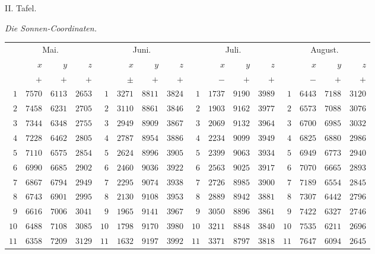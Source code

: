 \begin{center}
II. Tafel.

\medskip\emph{Die Sonnen-Coordinaten.}\medskip

\begingroup\fontsize{9}{10.2}\selectfont\setlength{\tabcolsep}{2pt}
\begin{tabular}{r|r|r|r||r|r|r|r||r|r|r|r||r|r|r|r}
\multicolumn{4}{c||}{Mai.} & \multicolumn{4}{c||}{Juni.} & \multicolumn{4}{c||}{Juli.} & \multicolumn{4}{c}{August.}\\[3pt]
 & $x$ & $y$ & $z$ &  & $x$ & $y$ & $z$ &  & $x$ & $y$ & $z$ &  & $x$ & $y$ & $z$\\
 & $+$ & $+$ & $+$ &  & $\pm$ & $+$ & $+$ &  & $-$ & $+$ & $+$ &  & $-$ & $+$ & $+$\\\hline
$1$ & $7570$ & $6113$ & $2653$ & $1$ & $3271$ & $8811$ & $3824$ & $1$ & $1737$ & $9190$ & $3989$ & $1$ & $6443$ & $7188$ & $3120$\\
$2$ & $7458$ & $6231$ & $2705$ & $2$ & $3110$ & $8861$ & $3846$ & $2$ & $1903$ & $9162$ & $3977$ & $2$ & $6573$ & $7088$ & $3076$\\
$3$ & $7344$ & $6348$ & $2755$ & $3$ & $2949$ & $8909$ & $3867$ & $3$ & $2069$ & $9132$ & $3964$ & $3$ & $6700$ & $6985$ & $3032$\\
$4$ & $7228$ & $6462$ & $2805$ & $4$ & $2787$ & $8954$ & $3886$ & $4$ & $2234$ & $9099$ & $3949$ & $4$ & $6825$ & $6880$ & $2986$\\
$5$ & $7110$ & $6575$ & $2854$ & $5$ & $2624$ & $8996$ & $3905$ & $5$ & $2399$ & $9063$ & $3934$ & $5$ & $6949$ & $6773$ & $2940$\\[3pt]
$6$ & $6990$ & $6685$ & $2902$ & $6$ & $2460$ & $9036$ & $3922$ & $6$ & $2563$ & $9025$ & $3917$ & $6$ & $7070$ & $6665$ & $2893$\\
$7$ & $6867$ & $6794$ & $2949$ & $7$ & $2295$ & $9074$ & $3938$ & $7$ & $2726$ & $8985$ & $3900$ & $7$ & $7189$ & $6554$ & $2845$\\
$8$ & $6743$ & $6901$ & $2995$ & $8$ & $2130$ & $9108$ & $3953$ & $8$ & $2889$ & $8942$ & $3881$ & $8$ & $7307$ & $6442$ & $2796$\\
$9$ & $6616$ & $7006$ & $3041$ & $9$ & $1965$ & $9141$ & $3967$ & $9$ & $3050$ & $8896$ & $3861$ & $9$ & $7422$ & $6327$ & $2746$\\
$10$ & $6488$ & $7108$ & $3085$ & $10$ & $1798$ & $9170$ & $3980$ & $10$ & $3211$ & $8848$ & $3840$ & $10$ & $7535$ & $6211$ & $2696$\\[3pt]
$11$ & $6358$ & $7209$ & $3129$ & $11$ & $1632$ & $9197$ & $3992$ & $11$ & $3371$ & $8797$ & $3818$ & $11$ & $7647$ & $6094$ & $2645$\\

\end{tabular}
\end{center}
